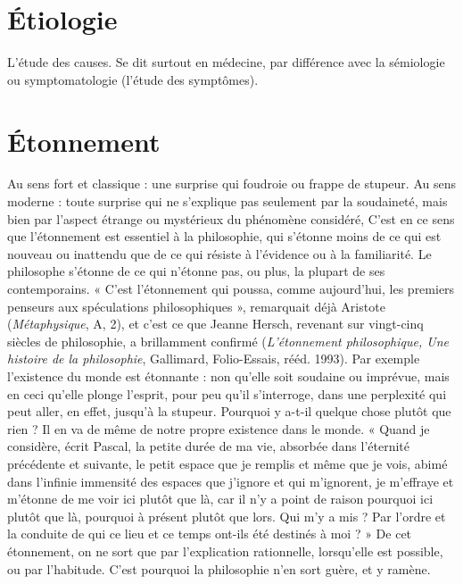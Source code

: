 \section{Étiologie}
L'étude des causes. Se dit surtout en médecine, par différence
avec la sémiologie ou symptomatologie (l'étude des symptômes).

\section{Étonnement}
Au sens fort et classique : une surprise qui foudroie ou
frappe de stupeur. Au sens moderne : toute surprise qui
ne s'explique pas seulement par la soudaineté, mais bien par l'aspect étrange ou
mystérieux du phénomène considéré, C’est en ce sens que l’étonnement est
essentiel à la philosophie, qui s'étonne moins de ce qui est nouveau ou inattendu
que de ce qui résiste à l’évidence ou à la familiarité. Le philosophe
s'étonne de ce qui n’étonne pas, ou plus, la plupart de ses contemporains.
« C’est l’étonnement qui poussa, comme aujourd’hui, les premiers penseurs
aux spéculations philosophiques », remarquait déjà Aristote ({\it Métaphysique}, A,
2), et c’est ce que Jeanne Hersch, revenant sur vingt-cinq siècles de philosophie,
a brillamment confirmé ({\it L'étonnement philosophique, Une histoire de la
philosophie}, Gallimard, Folio-Essais, rééd. 1993). Par exemple l’existence du
monde est étonnante : non qu’elle soit soudaine ou imprévue, mais en ceci
qu'elle plonge l'esprit, pour peu qu’il s'interroge, dans une perplexité qui peut
aller, en effet, jusqu’à la stupeur. Pourquoi y a-t-il quelque chose plutôt que
rien ? Il en va de même de notre propre existence dans le monde. « Quand je
considère, écrit Pascal, la petite durée de ma vie, absorbée dans l'éternité précédente
et suivante, le petit espace que je remplis et même que je vois, abimé dans
l'infinie immensité des espaces que j'ignore et qui m’ignorent, je m’effraye et
m'étonne de me voir ici plutôt que là, car il n’y a point de raison pourquoi ici
plutôt que là, pourquoi à présent plutôt que lors. Qui m’y a mis ? Par l’ordre et la
conduite de qui ce lieu et ce temps ont-ils été destinés à moi ? » De cet étonnement,
on ne sort que par l'explication rationnelle, lorsqu’elle est possible, ou par
l'habitude. C’est pourquoi la philosophie n’en sort guère, et y ramène.

